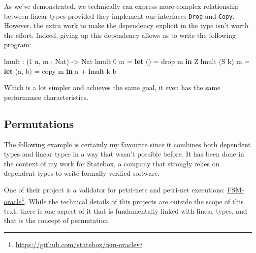 \documentclass[
]{article}
\newenvironment{Shaded}{}{}
\newcommand{\DataTypeTok}[1]{\textcolor[rgb]{0.56,0.13,0.00}{#1}}
\newcommand{\DecValTok}[1]{\textcolor[rgb]{0.25,0.63,0.44}{#1}}
\newcommand{\FunctionTok}[1]{\textcolor[rgb]{0.02,0.16,0.49}{#1}}
\newcommand{\KeywordTok}[1]{\textcolor[rgb]{0.00,0.44,0.13}{\textbf{#1}}}
\newcommand{\NormalTok}[1]{#1}
\newcommand{\OperatorTok}[1]{\textcolor[rgb]{0.40,0.40,0.40}{#1}}
\newcommand{\OtherTok}[1]{\textcolor[rgb]{0.00,0.44,0.13}{#1}}
\begin{document}
As we've demonstrated, we technically can express more complex
relationship between linear types provided they implement our interfaces
\texttt{Drop} and \texttt{Copy}. However, the extra work to make the
dependency explicit in the type isn't worth the effort. Indeed, giving
up this dependency allows us to write the following program:

\begin{Shaded}
\begin{Highlighting}[]
\NormalTok{lmult }\OperatorTok{:}\NormalTok{ (}\DecValTok{1}\NormalTok{ n, m }\OperatorTok{:} \DataTypeTok{Nat}\NormalTok{) }\OtherTok{{-}\textgreater{}} \DataTypeTok{Nat}
\NormalTok{lmult }\DecValTok{0}\NormalTok{ m }\OtherTok{=} \KeywordTok{let}\NormalTok{ () }\OtherTok{=} \FunctionTok{drop}\NormalTok{ m }\KeywordTok{in} \DataTypeTok{Z}
\NormalTok{lmult (}\DataTypeTok{S}\NormalTok{ k) m }\OtherTok{=} \KeywordTok{let}\NormalTok{ (a, b) }\OtherTok{=}\NormalTok{ copy m }\KeywordTok{in}\NormalTok{ a }\OperatorTok{+}\NormalTok{ lmult k b}
\end{Highlighting}
\end{Shaded}

Which is a lot simpler and achieves the same goal, it even has the same
performance characteristics.

\hypertarget{permutations}{%
\subsection{Permutations}\label{permutations}}

The following example is certainly my favourite since it combines both
dependent types and linear types in a way that wasn't possible before.
It has been done in the context of my work for Statebox, a company that
strongly relies on dependent types to write formally verified software.

One of their project is a validator for petri-nets\cite{petri-nets} and
petri-net executions:
\href{https://github.com/statebox/fsm-oracle}{FSM-oracle}\footnote{\url{https://github.com/statebox/fsm-oracle}}.
While the technical details of this projects are outside the scope of
this text, there is one aspect of it that is fundamentally linked with
linear types, and that is the concept of permutation.
\end{document}
